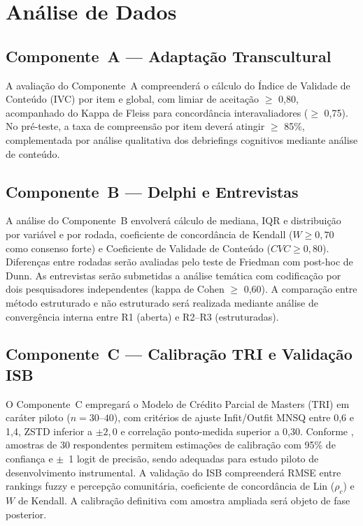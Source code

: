 \documentclass[12pt,a4paper,brazil]{article}
\begin{document}
\section{Análise de Dados}

\subsection{Componente~A --- Adaptação Transcultural}

A avaliação do Componente~A compreenderá o cálculo do Índice de Validade de Conteúdo (IVC) por item e global, com limiar de aceitação $\geq$ 0,80, acompanhado do Kappa de Fleiss para concordância interavaliadores ($\geq$ 0,75). No pré-teste, a taxa de compreensão por item deverá atingir $\geq$ 85\%, complementada por análise qualitativa dos debriefings cognitivos mediante análise de conteúdo.

\subsection{Componente~B --- Delphi e Entrevistas}

A análise do Componente~B envolverá cálculo de mediana, IQR e distribuição por variável e por rodada, coeficiente de concordância de Kendall ($W \geq 0{,}70$ como consenso forte) e Coeficiente de Validade de Conteúdo ($CVC \geq 0{,}80$). Diferenças entre rodadas serão avaliadas pelo teste de Friedman com post-hoc de Dunn. As entrevistas serão submetidas a análise temática \citep{Braun2006} com codificação por dois pesquisadores independentes (kappa de Cohen $\geq$ 0,60). A comparação entre método estruturado e não estruturado será realizada mediante análise de convergência interna entre R1 (aberta) e R2--R3 (estruturadas).

\subsection{Componente~C --- Calibração TRI e Validação ISB}

O Componente~C empregará o Modelo de Crédito Parcial de Masters (TRI) em caráter piloto ($n = 30$--$40$), com critérios de ajuste Infit/Outfit MNSQ entre 0,6 e 1,4, ZSTD inferior a $\pm 2{,}0$ e correlação ponto-medida superior a 0,30. Conforme \citet{Linacre1994}, amostras de 30 respondentes permitem estimações de calibração com 95\% de confiança e $\pm$~1 logit de precisão, sendo adequadas para estudo piloto de desenvolvimento instrumental. A validação do ISB compreenderá RMSE entre rankings fuzzy e percepção comunitária, coeficiente de concordância de Lin ($\rho_c$) e $W$ de Kendall. A calibração definitiva com amostra ampliada será objeto de fase posterior.
\end{document}
